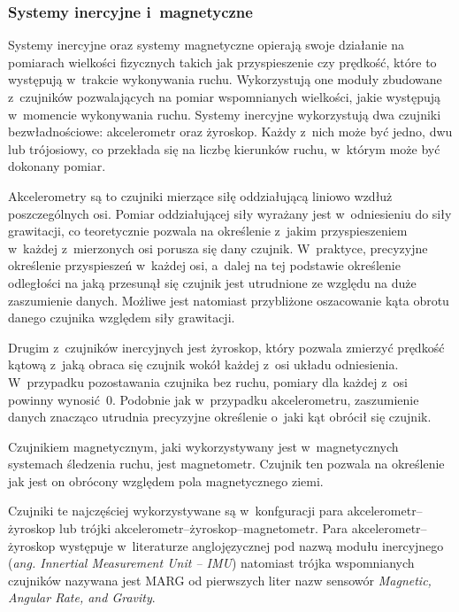 \subsubsection*{Systemy inercyjne i~magnetyczne}\label{chap:mocaps:IMU}
Systemy inercyjne oraz systemy magnetyczne opierają swoje działanie na pomiarach wielkości fizycznych takich jak przyspieszenie czy prędkość, które to występują w~trakcie wykonywania ruchu. Wykorzystują one moduły zbudowane z~czujników pozwalających na pomiar wspomnianych wielkości, jakie występują w~momencie wykonywania ruchu. Systemy inercyjne wykorzystują dwa czujniki bezwładnościowe: akcelerometr oraz żyroskop. Każdy z~nich może być jedno, dwu lub trójosiowy, co przekłada się na liczbę kierunków ruchu, w~którym może być dokonany pomiar.

Akcelerometry są to czujniki mierzące siłę oddziałującą liniowo wzdłuż poszczególnych osi. Pomiar oddziałującej siły wyrażany jest w~odniesieniu do siły grawitacji, co teoretycznie pozwala na określenie z~jakim przyspieszeniem w~każdej z~mierzonych osi porusza się dany czujnik. W~praktyce, precyzyjne określenie przyspieszeń w~każdej osi, a~dalej na tej podstawie określenie odległości na jaką przesunął się czujnik jest utrudnione ze względu na duże zaszumienie danych. Możliwe jest natomiast przybliżone oszacowanie kąta obrotu danego czujnika względem siły grawitacji.

Drugim z~czujników inercyjnych jest żyroskop, który pozwala zmierzyć prędkość kątową z~jaką obraca się czujnik wokół każdej z~osi układu odniesienia. W~przypadku pozostawania czujnika bez ruchu, pomiary dla każdej z~osi powinny wynosić~0. Podobnie jak w~przypadku akcelerometru, zaszumienie danych znacząco utrudnia precyzyjne określenie o~jaki kąt obrócił się czujnik.

Czujnikiem magnetycznym, jaki wykorzystywany jest w~magnetycznych systemach śledzenia ruchu, jest magnetometr. Czujnik ten pozwala na określenie jak jest on obrócony względem pola magnetycznego ziemi.

Czujniki te najczęściej wykorzystywane są w~konfguracji para akcelerometr--żyroskop lub trójki akcelerometr--żyroskop--magnetometr. Para akcelerometr--żyroskop występuje w~literaturze anglojęzycznej pod nazwą modułu inercyjnego (\emph{ang. Innertial Measurement Unit -- IMU}) natomiast trójka wspomnianych czujników nazywana jest MARG od pierwszych liter nazw sensowór \emph{Magnetic, Angular Rate, and Gravity}.

